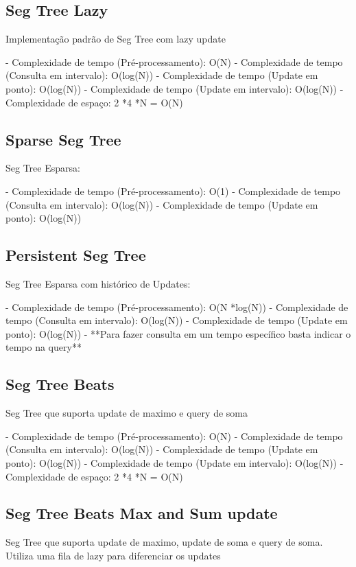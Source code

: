 \documentclass[11pt, a4paper, twoside]{article}
\begin{document}
\subsection{Seg Tree Lazy}

Implementação padrão de Seg Tree com lazy update

- Complexidade de tempo (Pré-processamento): O(N)
- Complexidade de tempo (Consulta em intervalo): O(log(N))
- Complexidade de tempo (Update em ponto): O(log(N))
- Complexidade de tempo (Update em intervalo): O(log(N))
- Complexidade de espaço: 2 *4 *N = O(N)

\subsection{Sparse Seg Tree}

Seg Tree Esparsa:

- Complexidade de tempo (Pré-processamento): O(1)
- Complexidade de tempo (Consulta em intervalo): O(log(N))
- Complexidade de tempo (Update em ponto): O(log(N))

\subsection{Persistent Seg Tree}

Seg Tree Esparsa com histórico de Updates:

- Complexidade de tempo (Pré-processamento): O(N *log(N))
- Complexidade de tempo (Consulta em intervalo): O(log(N))
- Complexidade de tempo (Update em ponto): O(log(N))
- **Para fazer consulta em um tempo específico basta indicar o tempo na query**

\subsection{Seg Tree Beats}

Seg Tree que suporta update de maximo e query de soma

- Complexidade de tempo (Pré-processamento): O(N)
- Complexidade de tempo (Consulta em intervalo): O(log(N))
- Complexidade de tempo (Update em ponto): O(log(N))
- Complexidade de tempo (Update em intervalo): O(log(N))
- Complexidade de espaço: 2 *4 *N = O(N)

\subsection{Seg Tree Beats Max and Sum update}

Seg Tree que suporta update de maximo, update de soma e query de soma.
Utiliza uma fila de lazy para diferenciar os updates
\end{document}
